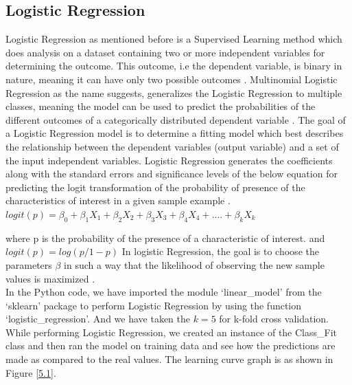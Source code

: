 \subsection{Logistic Regression}
Logistic Regression as mentioned before is a Supervised Learning method which does analysis on a dataset containing two or more independent variables for determining the outcome. This outcome, i.e the dependent variable, is binary in nature, meaning it can have only two possible outcomes \cite{link10}. Multinomial Logistic Regression as the name suggests, generalizes the Logistic Regression to multiple classes, meaning the model can be used to predict the probabilities of the different outcomes of a categorically distributed dependent variable \cite{link111}. The goal of a Logistic Regression model is to determine a fitting model which best describes the relationship between the dependent variables (output variable) and a set of the input independent variables. Logistic Regression generates the coefficients along with the standard errors and significance levels of the below equation for predicting the logit transformation of the probability of presence of the characteristics of interest in a given sample example \cite{link10}. \\

$logit(p) = \beta_0 + \beta_1X_1 + \beta_2X_2 +\beta_3X_3 + \beta_4X_4 + .... + \beta_kX_k$

where p is the probability of the presence of a characteristic of interest.
and $logit(p) = log(p/1-p)$
In logistic Regression, the goal is to choose the parameters $\beta$ in such a way that the likelihood of observing the new sample values is maximized \cite{link10}.\\
In the Python code, we have imported the module `linear\_model' from the `sklearn' package to perform Logistic Regression by using the function `logistic\_regression'. And we have taken the $k=5$ for k-fold cross validation. While performing Logistic Regression, we created an instance of the Class\_Fit class and then ran the model on training data and see how the predictions are made as compared to the real values. The learning curve graph is as shown in Figure \ref{5.1}.

